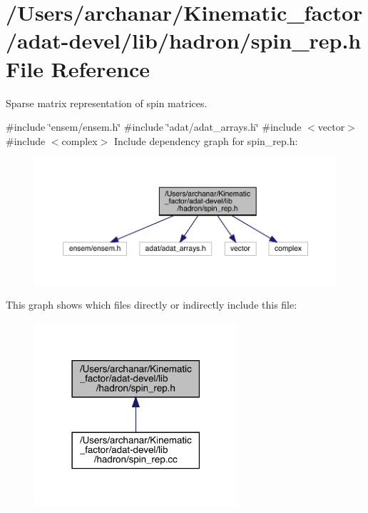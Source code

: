 \hypertarget{adat-devel_2lib_2hadron_2spin__rep_8h}{}\section{/\+Users/archanar/\+Kinematic\+\_\+factor/adat-\/devel/lib/hadron/spin\+\_\+rep.h File Reference}
\label{adat-devel_2lib_2hadron_2spin__rep_8h}


Sparse matrix representation of spin matrices.  


{\ttfamily \#include \char`\"{}ensem/ensem.\+h\char`\"{}}\newline
{\ttfamily \#include \char`\"{}adat/adat\+\_\+arrays.\+h\char`\"{}}\newline
{\ttfamily \#include $<$vector$>$}\newline
{\ttfamily \#include $<$complex$>$}\newline
Include dependency graph for spin\+\_\+rep.\+h\+:
\nopagebreak
\begin{figure}[H]
\begin{center}
\leavevmode
\includegraphics[width=350pt]{d8/dba/adat-devel_2lib_2hadron_2spin__rep_8h__incl}
\end{center}
\end{figure}
This graph shows which files directly or indirectly include this file\+:
\nopagebreak
\begin{figure}[H]
\begin{center}
\leavevmode
\includegraphics[width=214pt]{d4/d46/adat-devel_2lib_2hadron_2spin__rep_8h__dep__incl}
\end{center}
\end{figure}
